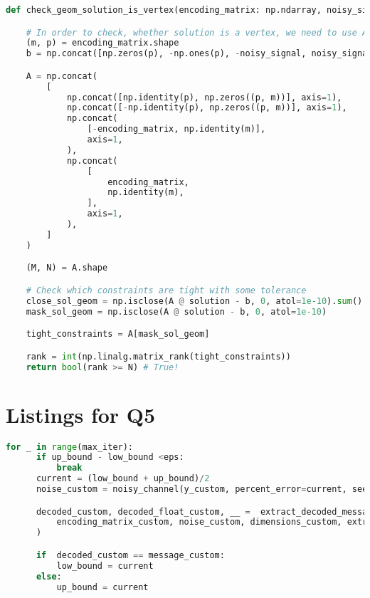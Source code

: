 \documentclass{article}
\begin{document}
\begin{minipage}{\linewidth}
  \begin{lstlisting}[language=Python, caption={Determining number of tight linear independent constraints for solution of linear problem in geometric form to ccheck whetther it it is a vertex of corresponding polyhedron}, label={lst:vertex}]
  def check_geom_solution_is_vertex(encoding_matrix: np.ndarray, noisy_signal: np.ndarray, solution: np.ndarray) -> bool:

    # In order to check, whether solution is a vertex, we need to use A and b from geometric form problem:
    (m, p) = encoding_matrix.shape
    b = np.concat([np.zeros(p), -np.ones(p), -noisy_signal, noisy_signal])

    A = np.concat(
        [
            np.concat([np.identity(p), np.zeros((p, m))], axis=1),
            np.concat([-np.identity(p), np.zeros((p, m))], axis=1),
            np.concat(
                [-encoding_matrix, np.identity(m)],
                axis=1,
            ),
            np.concat(
                [
                    encoding_matrix,
                    np.identity(m),
                ],
                axis=1,
            ),
        ]
    )

    (M, N) = A.shape

    # Check which constraints are tight with some tolerance
    close_sol_geom = np.isclose(A @ solution - b, 0, atol=1e-10).sum()
    mask_sol_geom = np.isclose(A @ solution - b, 0, atol=1e-10)

    tight_constraints = A[mask_sol_geom]

    rank = int(np.linalg.matrix_rank(tight_constraints))
    return bool(rank >= N) # True!

\end{lstlisting}
\end{minipage}

\section{Listings for Q5}

\begin{minipage}{\linewidth}
  \begin{lstlisting}[language=Python, caption={Binary search used to determine maximum level of noise up to what the message can be decrypted. \textit{extract\_fn} is either \textit{extract\_message\_geometric} or \textit{extract\_message\_standard}}, label={lst:bin}]
  for _ in range(max_iter):
      if up_bound - low_bound <eps:
          break
      current = (low_bound + up_bound)/2
      noise_custom = noisy_channel(y_custom, percent_error=current, seed=seed)

      decoded_custom, decoded_float_custom, __ =  extract_decoded_message(
          encoding_matrix_custom, noise_custom, dimensions_custom, extract_fn
      )

      if  decoded_custom == message_custom:
          low_bound = current
      else:
          up_bound = current
\end{lstlisting}
\end{minipage}
\end{document}
